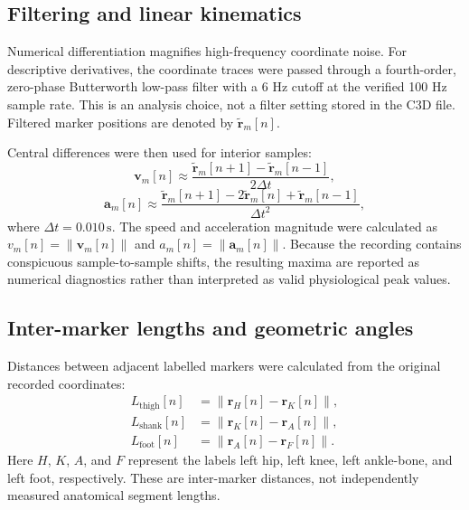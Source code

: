 \documentclass[12pt,a4paper]{article}
\newcommand{\unit}[1]{\,\mathrm{#1}}
\begin{document}
\subsection{Filtering and linear kinematics}

Numerical differentiation magnifies high-frequency coordinate noise. For descriptive derivatives, the coordinate traces were passed through a fourth-order, zero-phase Butterworth low-pass filter with a 6 Hz cutoff at the verified 100 Hz sample rate. This is an analysis choice, not a filter setting stored in the C3D file. Filtered marker positions are denoted by $\widetilde{\mathbf r}_m[n]$.

Central differences were then used for interior samples:
\begin{equation}
\mathbf{v}_m[n] \approx \frac{\widetilde{\mathbf r}_m[n+1]-\widetilde{\mathbf r}_m[n-1]}{2\Delta t},
\label{eq:velocity}
\end{equation}
\begin{equation}
\mathbf{a}_m[n] \approx \frac{\widetilde{\mathbf r}_m[n+1]-2\widetilde{\mathbf r}_m[n]+\widetilde{\mathbf r}_m[n-1]}{\Delta t^2},
\label{eq:acceleration}
\end{equation}
where $\Delta t=0.010\unit{s}$. The speed and acceleration magnitude were calculated as $v_m[n]=\|\mathbf{v}_m[n]\|$ and $a_m[n]=\|\mathbf{a}_m[n]\|$. Because the recording contains conspicuous sample-to-sample shifts, the resulting maxima are reported as numerical diagnostics rather than interpreted as valid physiological peak values.

\subsection{Inter-marker lengths and geometric angles}

Distances between adjacent labelled markers were calculated from the original recorded coordinates:
\begin{align}
L_{\mathrm{thigh}}[n] &= \|\mathbf r_H[n]-\mathbf r_K[n]\|,\\
L_{\mathrm{shank}}[n] &= \|\mathbf r_K[n]-\mathbf r_A[n]\|,\\
L_{\mathrm{foot}}[n] &= \|\mathbf r_A[n]-\mathbf r_F[n]\|.
\end{align}
Here $H$, $K$, $A$, and $F$ represent the labels left hip, left knee, left ankle-bone, and left foot, respectively. These are inter-marker distances, not independently measured anatomical segment lengths.
\end{document}
